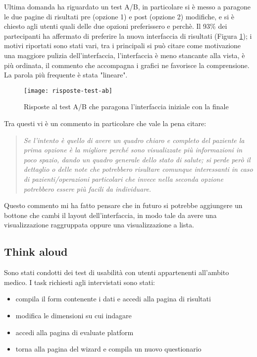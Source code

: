 Ultima domanda ha riguardato un test A/B, in particolare si è messo a paragone le due pagine di risultati pre (opzione 1) e post (opzione 2) modifiche, e si è chiesto agli utenti quali delle due opzioni preferissero e perchè. Il 93\% dei partecipanti ha affermato di preferire la nuova interfaccia di risultati (Figura \ref{fig:risposte-test-ab}); i motivi riportati sono stati vari, tra i principali si può citare come motivazione una maggiore pulizia dell'interfaccia, l'interfaccia è meno stancante alla vista, è più ordinata, il commento che accompagna i grafici ne favorisce la comprensione. La parola più frequente è stata "lineare". \\

\begin{figure}[!ht] 
    \centering 
    \texttt{[image: risposte-test-ab]}
    \caption{Risposte al test A/B che paragona l'interfaccia iniziale con la finale}
    \label{fig:risposte-test-ab}
\end{figure}

Tra questi vi è un commento in particolare che vale la pena citare: 
\begin{quote}
    \textit{Se l'intento è quello di avere un quadro chiaro e completo del paziente la prima opzione è la migliore perché sono visualizzate più informazioni in poco spazio, dando un quadro generale dello stato di salute; si perde però il dettaglio o delle note che potrebbero risultare comunque interessanti in caso di pazienti/operazioni particolari che invece nella seconda opzione potrebbero essere più facili da individuare.}
\end{quote}
Questo commento mi ha fatto pensare che in futuro si potrebbe aggiungere un bottone che cambi il layout dell'interfaccia, in modo tale da avere una visualizzazione raggruppata oppure una visualizzazione a lista.

\subsection{Think aloud}
Sono stati condotti dei test di usabilità con utenti appartenenti all'ambito medico.
I task richiesti agli intervistati sono stati:
\begin{itemize}
    \item compila il form contenente i dati e accedi alla pagina di risultati
    \item modifica le dimensioni su cui indagare
    \item accedi alla pagina di evaluate platform
    \item torna alla pagina del wizard e compila un nuovo questionario 
\end{itemize}


